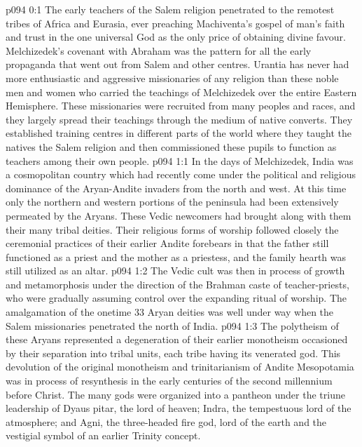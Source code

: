 \author{Melchizedek}
\vs p094 0:1 The early teachers of the Salem religion penetrated to the remotest tribes of Africa and Eurasia, ever preaching Machiventa’s gospel of man’s faith and trust in the one universal God as the only price of obtaining divine favour. Melchizedek’s covenant with Abraham was the pattern for all the early propaganda that went out from Salem and other centres. Urantia has never had more enthusiastic and aggressive missionaries of any religion than these noble men and women who carried the teachings of Melchizedek over the entire Eastern Hemisphere. These missionaries were recruited from many peoples and races, and they largely spread their teachings through the medium of native converts. They established training centres in different parts of the world where they taught the natives the Salem religion and then commissioned these pupils to function as teachers among their own people.
\vs p094 1:1 In the days of Melchizedek, India was a cosmopolitan country which had recently come under the political and religious dominance of the Aryan\hyp{}Andite invaders from the north and west. At this time only the northern and western portions of the peninsula had been extensively permeated by the Aryans. These Vedic newcomers had brought along with them their many tribal deities. Their religious forms of worship followed closely the ceremonial practices of their earlier Andite forebears in that the father still functioned as a priest and the mother as a priestess, and the family hearth was still utilized as an altar.
\vs p094 1:2 The Vedic cult was then in process of growth and metamorphosis under the direction of the Brahman caste of teacher\hyp{}priests, who were gradually assuming control over the expanding ritual of worship. The amalgamation of the onetime 33 Aryan deities was well under way when the Salem missionaries penetrated the north of India.
\vs p094 1:3 The polytheism of these Aryans represented a degeneration of their earlier monotheism occasioned by their separation into tribal units, each tribe having its venerated god. This devolution of the original monotheism and trinitarianism of Andite Mesopotamia was in process of resynthesis in the early centuries of the second millennium before Christ. The many gods were organized into a pantheon under the triune leadership of Dyaus pitar, the lord of heaven; Indra, the tempestuous lord of the atmosphere; and Agni, the three\hyp{}headed fire god, lord of the earth and the vestigial symbol of an earlier Trinity concept.
